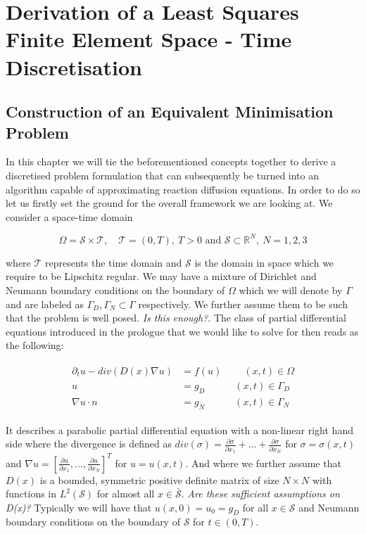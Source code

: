 \documentclass[../draft_1.tex]{subfiles}
\begin{document}
\chapter{Derivation of a Least Squares Finite Element Space - Time Discretisation}
\section{Construction of an Equivalent Minimisation Problem}

In this chapter we will tie the beforementioned concepts together to derive a discretised problem formulation that can subsequently be turned into an algorithm capable of approximating reaction diffusion equations. In order to do so let us firstly set the ground for the overall framework we are looking at. We consider a space-time domain 
\begin{ceqn}
\begin{equation}
\Omega = \mathcal{S} \times \mathcal{T}, \quad \mathcal{T} = (0,T), \ T>0 \text{ and }  \mathcal{S} \subset \mathbb{R}^N, \ N = 1,2,3
\end{equation} 
\end{ceqn}
where $\mathcal{T} $ represents the time domain and $ \mathcal{S}$ is the domain in space which we require to be Lipschitz regular. We may have a mixture of Dirichlet and Neumann boundary conditions on the boundary of $\Omega$ which we will denote by $\Gamma$ and are labeled as $\Gamma_D, \Gamma_N \subset \Gamma$ respectively. We further assume them to be such that the problem is well posed. \textit{Is this enough?}.  The class of partial differential equations introduced in the prologue that we would like to solve for then reads as the following:
\begin{ceqn}
\begin{align}
\begin{aligned}
\partial_t u - div (D(x) \nabla u) &= f(u) \qquad \  (x,t) \in \Omega \\
u &= g_D \quad \qquad (x,t)  \in \Gamma_D \\
\nabla u \cdot n &= g_N \quad \qquad (x,t) \in \Gamma_N
\end{aligned}
\end{align}
\end{ceqn}
It describes a parabolic partial differential equation with a non-linear right hand side where the divergence is defined as $div(\sigma) = \frac{\partial \sigma}{\partial x_1} + ... + \frac{\partial \sigma}{\partial x_N}$ for $\sigma = \sigma(x,t)$ and $\nabla u = [\frac{\partial u}{\partial x_1}, ..., \frac{\partial u}{\partial x_N} ]^T$ for $u = u(x,t)$. And where we further assume that $D(x)$ is a bounded, symmetric positive definite matrix of size $N \times N$ with functions in $L^2(\mathcal{S})$ for almost all $ x \in \bar{\mathcal{S}}$. \textit{Are these sufficient assumptions on D(x)?} Typically we will have that $u(x,0) = u_0 = g_D$ for all $ x \in \mathcal{S}$ and Neumann boundary conditions on the boundary of $\mathcal{S}$ for $t \in (0,T)$. 
\end{document}
